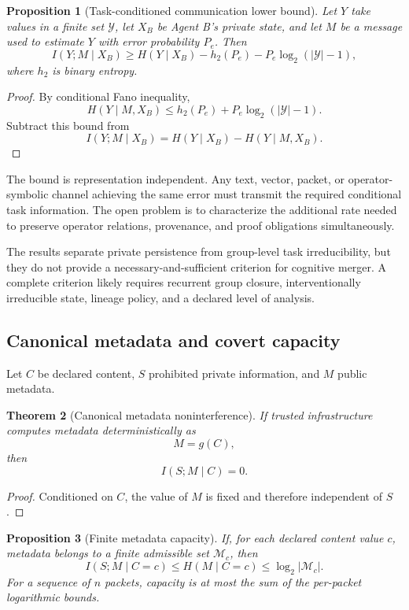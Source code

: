 \documentclass[11pt]{article}
\newtheorem{theorem}{Theorem}[section]
\newtheorem{proposition}[theorem]{Proposition}
\theoremstyle{definition}
\theoremstyle{remark}
\begin{document}
\begin{proposition}[Task-conditioned communication lower bound]
Let \(Y\) take values in a finite set \(\mathcal Y\), let \(X_B\) be Agent B's private state, and let \(M\) be a message used to estimate \(Y\) with error probability \(P_e\). Then
\[
I(Y;M\mid X_B)
\ge
H(Y\mid X_B)
-
 h_2(P_e)
-
P_e\log_2(|\mathcal Y|-1),
\]
where \(h_2\) is binary entropy.
\end{proposition}

\begin{proof}
By conditional Fano inequality,
\[
H(Y\mid M,X_B)
\le
h_2(P_e)+P_e\log_2(|\mathcal Y|-1).
\]
Subtract this bound from
\[
I(Y;M\mid X_B)=H(Y\mid X_B)-H(Y\mid M,X_B).
\]
\end{proof}

The bound is representation independent. Any text, vector, packet, or operator-symbolic channel achieving the same error must transmit the required conditional task information. The open problem is to characterize the additional rate needed to preserve operator relations, provenance, and proof obligations simultaneously.

\begin{placeholderbox}
The results separate private persistence from group-level task irreducibility, but they do not provide a necessary-and-sufficient criterion for cognitive merger. A complete criterion likely requires recurrent group closure, interventionally irreducible state, lineage policy, and a declared level of analysis.
\end{placeholderbox}

\subsection{Canonical metadata and covert capacity}

Let \(C\) be declared content, \(S\) prohibited private information, and \(M\) public metadata.

\begin{theorem}[Canonical metadata noninterference]
If trusted infrastructure computes metadata deterministically as
\[
M=g(C),
\]
then
\[
I(S;M\mid C)=0.
\]
\end{theorem}

\begin{proof}
Conditioned on \(C\), the value of \(M\) is fixed and therefore independent of \(S\).
\end{proof}

\begin{proposition}[Finite metadata capacity]
If, for each declared content value \(c\), metadata belongs to a finite admissible set \(\mathcal M_c\), then
\[
I(S;M\mid C=c)
\le
H(M\mid C=c)
\le
\log_2|\mathcal M_c|.
\]
For a sequence of \(n\) packets, capacity is at most the sum of the per-packet logarithmic bounds.
\end{proposition}
\end{document}
